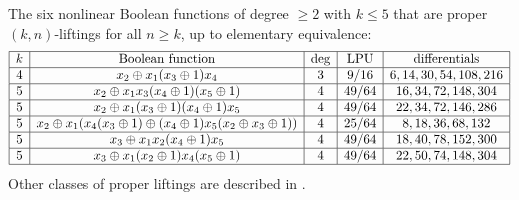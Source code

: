 \documentclass[11pt,english,a4paper]{amsart}
\theoremstyle{plain}
\theoremstyle{definition}
\theoremstyle{remark}
\begin{document}
	The six nonlinear Boolean functions of degree $\geq 2$ with $k \leq 5$ that are proper $(k,n)$-liftings for all $n \geq k$, up to elementary equivalence:
	\[
	\begin{array}{|c|c|c|c|c|} \hline
		k & \text{Boolean function}  & \deg & \operatorname{LPU} & \text{differentials} \\ \hline
		4 & x_2 \oplus x_1 (x_3 \oplus 1) x_4 & 3 & 9/16 & 6, 14, 30, 54, 108, 216 \\
		\hline
		5 & x_2 \oplus x_1 x_3 (x_4 \oplus 1) (x_5 \oplus 1) & 4 & 49/64 & 16, 34, 72, 148, 304 \\
		\hline
		5 & x_2 \oplus x_1 (x_3 \oplus 1) (x_4 \oplus 1) x_5 & 4 & 49/64 & 22, 34, 72, 146, 286 \\
		\hline
		5 & x_2 \oplus x_1 (x_4 (x_3 \oplus 1) \oplus (x_4 \oplus 1) x_5 (x_2 \oplus x_3 \oplus 1)) & 4 & 25/64 & 8, 18, 36, 68, 132\\
		\hline
		5 & x_3 \oplus x_1 x_2 (x_4 \oplus 1) x_5 & 4 & 49/64 & 18, 40, 78, 152, 300\\
		\hline
		5 & x_3 \oplus x_1 (x_2 \oplus 1) x_4 (x_5 \oplus 1) & 4 & 49/64 & 22, 50, 74, 148, 304 \\
		\hline
	\end{array}
	\]
	 Other classes of proper liftings are described in \cite{HO-2}.
	
\end{document}
